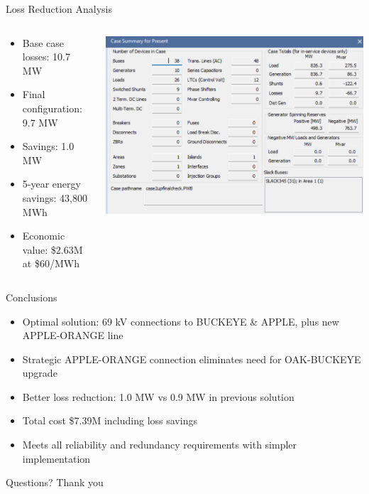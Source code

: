 \documentclass{beamer}
\begin{document}
	\begin{frame}{Loss Reduction Analysis}
		\begin{columns}[T]
			\begin{column}{0.4\textwidth}
				\begin{itemize}
					\item Base case losses: 10.7 MW
					\item Final configuration: 9.7 MW
					\item Savings: 1.0 MW
					\item 5-year energy savings: 43,800 MWh
					\item Economic value: \$2.63M at \$60/MWh
				\end{itemize}
			\end{column}
			\begin{column}{0.6\textwidth}
				\includegraphics[width=1\linewidth]{figures/case1_plusnewline_loss}
			\end{column}
		\end{columns}
	\end{frame}
	
	\begin{frame}{Conclusions}
		\begin{itemize}
			\item Optimal solution: 69 kV connections to BUCKEYE \& APPLE, plus new APPLE-ORANGE line
			\item Strategic APPLE-ORANGE connection eliminates need for OAK-BUCKEYE upgrade
			\item Better loss reduction: 1.0 MW vs 0.9 MW in previous solution
			\item Total cost \$7.39M including loss savings
			\item Meets all reliability and redundancy requirements with simpler implementation
		\end{itemize}
	\end{frame}
	
	\begin{frame}{Questions?}
		\centering
		\Large{Thank you}
	\end{frame}
	
\end{document}
